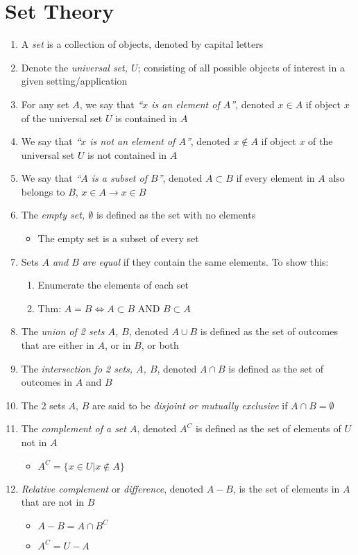 \section{Set Theory} \label{sec:Set Theory}
\begin{enumerate}
	\item A \emph{set} is a collection of objects, denoted by capital letters
	\item Denote the \emph{universal set, $U$}; consisting of all possible objects of interest in a given setting/application
	\item For any set $A$, we say that \emph{``$x$ is an element of $A$''}, denoted $x \in A$ if object $x$ of the universal set $U$ is contained in $A$
	\item We say that \emph{``$x$ is not an element of $A$''}, denoted $x \notin A$ if object $x$ of the universal set $U$ is not contained in $A$
	\item We say that \emph{``$A$ is a subset of $B$''}, denoted $A \subset B$ if every element in $A$ also belongs to $B$, $x \in A \rightarrow x \in B$
	\item The \emph{empty set, $\emptyset$} is defined as the set with no elements
		\begin{itemize}[noitemsep, nolistsep]
			\item The empty set is a subset of every set
		\end{itemize}
	\item Sets \emph{$A$ and $B$ are equal} if they contain the same elements. To show this:
		\begin{enumerate}
			\item Enumerate the elements of each set
			\item Thm: $A=B \iff A \subset B$ AND $B \subset A$
		\end{enumerate}
	\item The \emph{union of 2 sets $A$, $B$}, denoted $A \cup B$ is defined as the set of outcomes that are either in $A$, or in $B$, or both
	\item The \emph{intersection fo 2 sets, $A$, $B$}, denoted $A \cap B$ is defined as the set of outcomes in $A$ and $B$
	\item The 2 sets $A$, $B$ are said to be \emph{disjoint or mutually exclusive} if $A \cap B = \emptyset$
	\item The \emph{complement of a set $A$}, denoted $A^{C}$ is defined as the set of elements of $U$ not in $A$
		\begin{itemize}[noitemsep, nolistsep]
			\item $A^{C} = \lbrace x \in U \vert x \notin A \rbrace$
		\end{itemize}
	\item \emph{Relative complement} or \emph{difference}, denoted $A-B$, is the set of elements in $A$ that are not in $B$
		\begin{itemize}[noitemsep, nolistsep]
			\item $A-B = A \cap B^{C}$
			\item $A^{C} = U - A$
		\end{itemize}
\end{enumerate}

